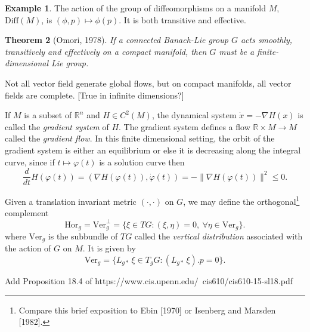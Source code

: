 \documentclass{article}
\theoremstyle{plain}
\newtheorem{teo}{Theorem}[section]
\theoremstyle{definition}
\newtheorem{exam}[teo]{Example}
\numberwithin{equation}{section}
\newcommand{\R}{\ensuremath{\mathbb{R}}}
\newcommand{\Diff}{\ensuremath{\mathrm{Diff}}}
\begin{document}
\begin{exam}
	The action of the group of diffeomorphisms on a manifold $M$, $\Diff(M)$, is $(\phi,p)\mapsto \phi(p)$. It is both transitive and effective.
\end{exam}

\begin{teo}[Omori, 1978]
	If a connected Banach-Lie group $G$ acts smoothly, transitively and effectively on a compact manifold, then $G$ must be a finite-dimensional Lie group.
\end{teo}

Not all vector field generate global flows, but on compact manifolds, all vector fields are complete. [True in infinite dimensions?]

If $M$ is a subset of $\R^n$ and $H\in C^2(M)$, the dynamical system $\dot{x}=-\nabla H(x)$ is called the \textit{gradient system} of $H$. The gradient system defines a flow $\R\times M\to M$ called the \textit{gradient flow}. In this finite dimensional setting, the orbit of the gradient system is either an equilibrium or else it is decreasing along the integral curve, since if $t\mapsto \varphi(t)$ is a solution curve then
\[
\frac{d}{dt}H(\varphi(t))=(\nabla H(\varphi(t)),\dot{\varphi}(t))=-\|\nabla H(\varphi(t))\|^2\leq 0.
\]




Given a translation invariant metric $(\cdot,\cdot)$ on $G$, we may define the orthogonal\footnote{Compare this brief exposition to Ebin [1970] or Isenberg and Marsden [1982].}  complement
\[
\mathrm{Hor}_g=\mathrm{Ver}_g^\perp=\{\xi\in TG : (\xi,\eta)=0,\ \forall\eta\in\mathrm{Ver}_g\}.
\]
where $\mathrm{Ver}_g$ is the subbundle of $TG$ called the \textit{vertical distribution} associated with the action of $G$ on $M$. It is given by
\[
\mathrm{Ver}_g=\{L_{g*}\,\xi\in T_{g}G : (L_{g*}\,\xi).p=0\}.
\]


Add Proposition 18.4 of https://www.cis.upenn.edu/~cis610/cis610-15-sl18.pdf
\end{document}
